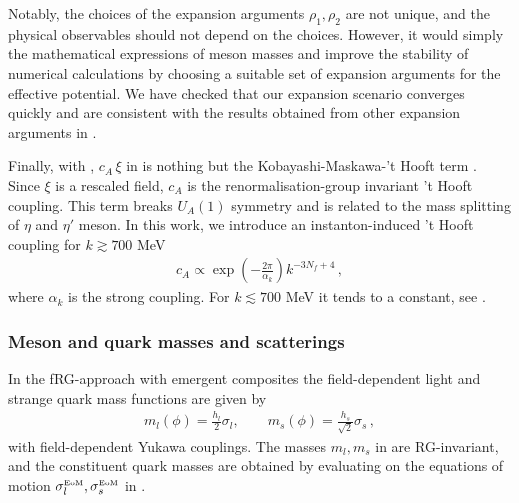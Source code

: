 \documentclass[reprint,twocolumn,superscriptaddress,preprintnumbers,amsmath,amssymb,aps,prd,floatfix]{revtex4-2}
\begin{document}
Notably, the choices of the expansion arguments $\rho_1, \rho_2$ are not unique, and the physical observables should not depend on the choices. However, it would simply the mathematical expressions of meson masses and improve the stability of numerical calculations by choosing a suitable set of expansion arguments for the effective potential. We have checked that our expansion scenario converges quickly and are consistent with the results obtained from other expansion arguments in \cite{Rennecke:2016tkm, Mitter:2013fxa}.

Finally, with , $c_A \,\xi$ in  is nothing but the Kobayashi-Maskawa-'t Hooft term \cite{Kobayashi:1970ji, tHooft:1976rip, tHooft:1976snw}. Since $\xi$ is a rescaled field, $c_A$ is the renormalisation-group invariant 't Hooft coupling. This term breaks $U_A(1)$ symmetry and is related to the mass splitting of $\eta$ and $\eta'$ meson. In this work, we introduce an instanton-induced 't Hooft coupling \cite{Pawlowski:1996ch} for $k \gtrsim 700$ MeV 
%
\begin{align}
 c_A \propto \exp\left(- \frac{2 \pi}{\alpha_{k}} \right) k^{-3 N_f+4}\,,
\end{align}
%
where $\alpha_{k}$ is the strong coupling. For $k \lesssim 700$ MeV it tends to a constant, see .


\subsubsection{Meson and quark masses and scatterings}
\label{app:mesonmass}

In the fRG-approach with emergent composites the field-dependent light and strange quark mass functions are given by 
%
\begin{align}
	m_l(\phi)=\frac{h_{l}}{2}\sigma_l , \qquad m_s(\phi)=\frac{h_{s}}{\sqrt{2}}\sigma_s\,, 
\label{quarkmass_eq}
\end{align}
%
with field-dependent Yukawa couplings. The masses $m_{l},m_s$ in  are RG-invariant, and the constituent quark masses are obtained by evaluating  on the equations of motion $\sigma^\textrm{\tiny{EoM}}_l, \sigma^\textrm{\tiny{EoM}}_s$ in . 
\end{document}
